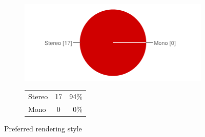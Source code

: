 \documentclass[MSc,paper=a4,pagesize=auto]{icldt}
\begin{document}
\begin{figure}[htbp!]
\centering
\begin{subfigure}{0.4\textwidth}
    \centering
    \includegraphics[width=1\linewidth]{resources/15-preferred_use_type}
\end{subfigure}%
\centering
\begin{subfigure}{\textwidth}
    \centering
   	\begin{tabular}{ l c r }
Stereo&17&94\% \\
Mono&0&0\% \\
\end{tabular}
\end{subfigure} 
    \caption{Preferred rendering style}
    \label{fig:15-preferred_use_type}
\end{figure}
\end{document}

